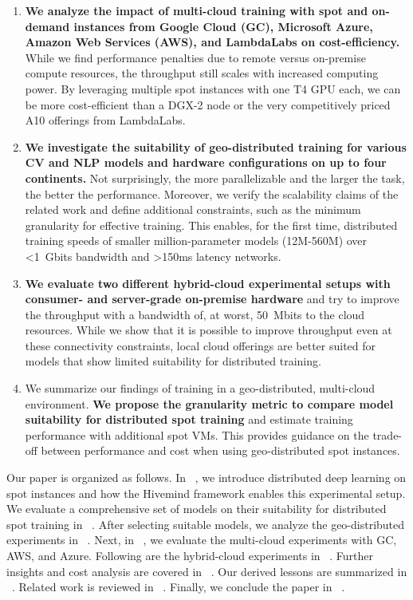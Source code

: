 \begin{enumerate}
    \item \textbf{We analyze the impact of multi-cloud training with spot and on-demand instances from Google Cloud (GC), Microsoft Azure, Amazon Web Services (AWS), and LambdaLabs on cost-efficiency.} While we find performance penalties due to remote versus on-premise compute resources, the throughput still scales with increased computing power. By leveraging multiple spot instances with one T4 GPU each, we can be more cost-efficient than a DGX-2 node or the very competitively priced A10 offerings from LambdaLabs.
    \item \textbf{We investigate the suitability of geo-distributed training for various CV and NLP models and hardware configurations on up to four continents.} Not surprisingly, the more parallelizable and the larger the task, the better the performance. Moreover, we verify the scalability claims of the related work and define additional constraints, such as the minimum granularity for effective training. This enables, for the first time, distributed training speeds of smaller million-parameter models (12M-560M) over <1~Gbits bandwidth and >150ms latency networks.
    \item \textbf{We evaluate two different hybrid-cloud experimental setups with consumer- and server-grade on-premise hardware} and try to improve the throughput with a bandwidth of, at worst, 50~Mbits to the cloud resources. While we show that it is possible to improve throughput even at these connectivity constraints, local cloud offerings are better suited for models that show limited suitability for distributed training.
    \item We summarize our findings of training in a geo-distributed, multi-cloud environment. \textbf{We propose the granularity metric to compare model suitability for distributed spot training} and estimate training performance with additional spot VMs. This provides guidance on the trade-off between performance and cost when using geo-distributed spot instances.
\end{enumerate}

Our paper is organized as follows.
In ~, we introduce distributed deep learning on spot instances and how the Hivemind framework enables this experimental setup.
We evaluate a comprehensive set of models on their suitability for distributed spot training in ~.
After selecting suitable models, we analyze the geo-distributed experiments in ~.
Next, in ~, we evaluate the multi-cloud experiments with GC, AWS, and Azure.
Following are the hybrid-cloud experiments in ~.
Further insights and cost analysis are covered in ~.
Our derived lessons are summarized in ~.
Related work is reviewed in ~.
Finally, we conclude the paper in ~.